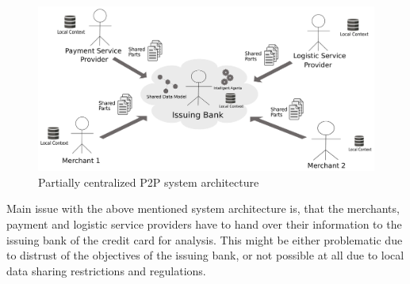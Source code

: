 \begin{figure}[H]
	\centering
		\includegraphics[width=0.8\columnwidth]{images/system_P2P_centralized.pdf}
	\caption{Partially centralized \gls{P2P} system architecture}
\label{fig:images_p2p_centralized}
\end{figure}

Main issue with the above mentioned system architecture is, that the merchants, payment and logistic service providers have to hand over their information to the issuing bank of the credit card for analysis. This might be either problematic due to distrust of the objectives of the issuing bank, or not possible at all due to local data sharing restrictions and regulations.


